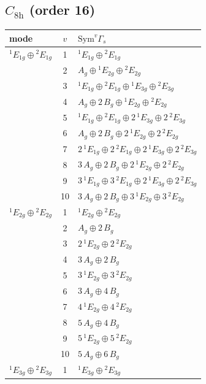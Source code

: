 \documentclass[11pt]{article}
\begin{document}
\subsection*{$C_{8\mathrm{h}}$ \quad (order 16)}
\begin{longtable}{l c p{}}
\hline mode & $v$ & $\mathrm{Sym}^v\Gamma_s$\\ \hline\endhead
${}^{1}E_{1g}\oplus {}^{2}E_{1g}$ & 1 & ${}^{1}E_{1g}\oplus {}^{2}E_{1g}$\\
 & 2 & $A_{g}\oplus {}^{1}E_{2g}\oplus {}^{2}E_{2g}$\\
 & 3 & ${}^{1}E_{1g}\oplus {}^{2}E_{1g}\oplus {}^{1}E_{3g}\oplus {}^{2}E_{3g}$\\
 & 4 & $A_{g}\oplus 2\,B_{g}\oplus {}^{1}E_{2g}\oplus {}^{2}E_{2g}$\\
 & 5 & ${}^{1}E_{1g}\oplus {}^{2}E_{1g}\oplus 2\,{}^{1}E_{3g}\oplus 2\,{}^{2}E_{3g}$\\
 & 6 & $A_{g}\oplus 2\,B_{g}\oplus 2\,{}^{1}E_{2g}\oplus 2\,{}^{2}E_{2g}$\\
 & 7 & $2\,{}^{1}E_{1g}\oplus 2\,{}^{2}E_{1g}\oplus 2\,{}^{1}E_{3g}\oplus 2\,{}^{2}E_{3g}$\\
 & 8 & $3\,A_{g}\oplus 2\,B_{g}\oplus 2\,{}^{1}E_{2g}\oplus 2\,{}^{2}E_{2g}$\\
 & 9 & $3\,{}^{1}E_{1g}\oplus 3\,{}^{2}E_{1g}\oplus 2\,{}^{1}E_{3g}\oplus 2\,{}^{2}E_{3g}$\\
 & 10 & $3\,A_{g}\oplus 2\,B_{g}\oplus 3\,{}^{1}E_{2g}\oplus 3\,{}^{2}E_{2g}$\\
\hline
${}^{1}E_{2g}\oplus {}^{2}E_{2g}$ & 1 & ${}^{1}E_{2g}\oplus {}^{2}E_{2g}$\\
 & 2 & $A_{g}\oplus 2\,B_{g}$\\
 & 3 & $2\,{}^{1}E_{2g}\oplus 2\,{}^{2}E_{2g}$\\
 & 4 & $3\,A_{g}\oplus 2\,B_{g}$\\
 & 5 & $3\,{}^{1}E_{2g}\oplus 3\,{}^{2}E_{2g}$\\
 & 6 & $3\,A_{g}\oplus 4\,B_{g}$\\
 & 7 & $4\,{}^{1}E_{2g}\oplus 4\,{}^{2}E_{2g}$\\
 & 8 & $5\,A_{g}\oplus 4\,B_{g}$\\
 & 9 & $5\,{}^{1}E_{2g}\oplus 5\,{}^{2}E_{2g}$\\
 & 10 & $5\,A_{g}\oplus 6\,B_{g}$\\
\hline
${}^{1}E_{3g}\oplus {}^{2}E_{3g}$ & 1 & ${}^{1}E_{3g}\oplus {}^{2}E_{3g}$\\

\end{longtable}
\end{document}
